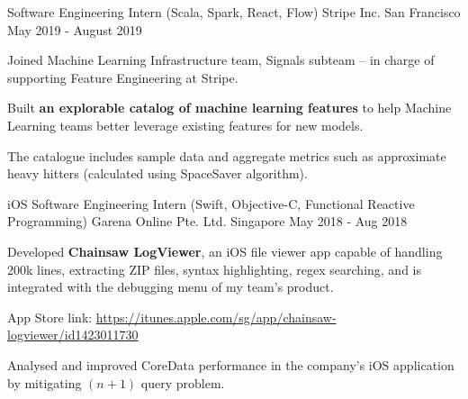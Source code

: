 

\begin{cventries}


  \cventry
  {Software Engineering Intern (Scala, Spark, React, Flow)} %
  {Stripe Inc.} %
  {San Francisco} %
  {May 2019 - August 2019} %
  {
    \begin{cvitems}
      \item {Joined Machine Learning Infrastructure team, Signals subteam -- in charge of supporting Feature Engineering at Stripe.}
      \item {Built \textbf{an explorable catalog of machine learning features} to help Machine Learning teams better leverage existing features for new models.}
      \item {The catalogue includes sample data and aggregate metrics such as approximate heavy hitters (calculated using SpaceSaver algorithm).}
    \end{cvitems}
  }

  \cventry
  {iOS Software Engineering Intern (Swift, Objective-C, Functional Reactive Programming)} %
  {Garena Online Pte. Ltd.} %
  {Singapore} %
  {May 2018 - Aug 2018} %
  {
    \begin{cvitems}
      \item {Developed \textbf{Chainsaw LogViewer}, an iOS file viewer app capable of handling 200k lines, extracting ZIP files, syntax highlighting, regex searching, and is integrated with the debugging menu of my team's product.}
      \item {App Store link: \url{https://itunes.apple.com/sg/app/chainsaw-logviewer/id1423011730}}
      \item {Analysed and improved CoreData performance in the company's iOS application by mitigating $(n+1)$ query problem.}
    \end{cvitems}
  }


\end{cventries}
